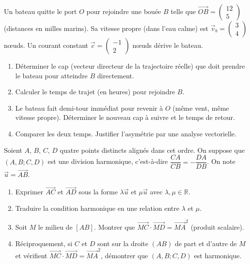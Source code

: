 \documentclass[11pt]{article}
\begin{document}
\begin{exercice}
Un bateau quitte le port $O$ pour rejoindre une bouée $B$ telle que $\overrightarrow{OB} = \begin{pmatrix} 12 \\ 5 \end{pmatrix}$ (distances en milles marins).
Sa vitesse propre (dans l'eau calme) est $\vec{v}_b = \begin{pmatrix} 3 \\ 4 \end{pmatrix}$ nœuds.
Un courant constant $\vec{c} = \begin{pmatrix} -1 \\ 2 \end{pmatrix}$ nœuds dérive le bateau.
\begin{enumerate}
    \item Déterminer le cap (vecteur directeur de la trajectoire réelle) que doit prendre le bateau pour atteindre $B$ directement.
    \item Calculer le temps de trajet (en heures) pour rejoindre $B$.
    \item Le bateau fait demi-tour immédiat pour revenir à $O$ (même vent, même vitesse propre). Déterminer le nouveau cap à suivre et le temps de retour.
    \item Comparer les deux temps. Justifier l'asymétrie par une analyse vectorielle.
\end{enumerate}
\end{exercice}

\begin{exercice}
Soient $A$, $B$, $C$, $D$ quatre points distincts alignés dans cet ordre. On suppose que $(A,B;C,D)$ est une division harmonique, c'est-à-dire $\dfrac{CA}{CB} = -\dfrac{DA}{DB}$.
On note $\vec{u} = \overrightarrow{AB}$.
\begin{enumerate}
    \item Exprimer $\overrightarrow{AC}$ et $\overrightarrow{AD}$ sous la forme $\lambda\vec{u}$ et $\mu\vec{u}$ avec $\lambda,\mu\in\mathbb{R}$.
    \item Traduire la condition harmonique en une relation entre $\lambda$ et $\mu$.
    \item Soit $M$ le milieu de $[AB]$. Montrer que $\overrightarrow{MC}\cdot\overrightarrow{MD} = \overrightarrow{MA}^2$ (produit scalaire).
    \item Réciproquement, si $C$ et $D$ sont sur la droite $(AB)$ de part et d'autre de $M$ et vérifient $\overrightarrow{MC}\cdot\overrightarrow{MD} = \overrightarrow{MA}^2$, démontrer que $(A,B;C,D)$ est harmonique.
\end{enumerate}
\end{exercice}
\end{document}
